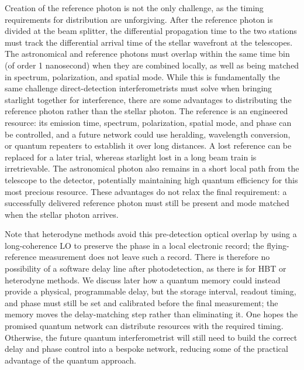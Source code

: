 \documentclass[]{spie}
\begin{document}
Creation of the reference photon is not the only challenge, as the timing requirements for distribution are unforgiving. After the reference photon is divided at the beam splitter, the differential propagation time to the two stations must track the differential arrival time of the stellar wavefront at the telescopes. The astronomical and reference photons must overlap within the same time bin (of order 1 nanosecond) when they are combined locally, as well as being matched in spectrum, polarization, and spatial mode. While this is fundamentally the same challenge direct-detection interferometrists must solve when bringing starlight together for interference, there are some advantages to distributing the reference photon rather than the stellar photon. The reference is an engineered resource: its emission time, spectrum, polarization, spatial mode, and phase can be controlled, and a future network could use heralding, wavelength conversion, or quantum repeaters to establish it over long distances. A lost reference can be replaced for a later trial, whereas starlight lost in a long beam train is irretrievable. The astronomical photon also remains in a short local path from the telescope to the detector, potentially maintaining high quantum efficiency for this most precious resource. These advantages do not relax the final requirement: a successfully delivered reference photon must still be present and mode matched when the stellar photon arrives.

Note that heterodyne methods avoid this pre-detection optical overlap by using a long-coherence LO to preserve the phase in a local electronic record; the flying-reference measurement does not leave such a record. There is therefore no possibility of a software delay line after photodetection, as there is for HBT or heterodyne methods. We discuss later how a quantum memory could instead provide a physical, programmable delay, but the storage interval, readout timing, and phase must still be set and calibrated before the final measurement; the memory moves the delay-matching step rather than eliminating it. One hopes the promised quantum network can distribute resources with the required timing. Otherwise, the future quantum interferometrist will still need to build the correct delay and phase control into a bespoke network, reducing some of the practical advantage of the quantum approach.
\end{document}
